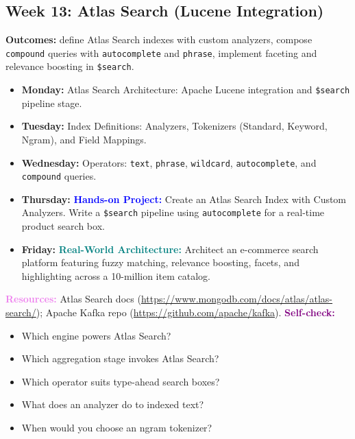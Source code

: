\documentclass[11pt, a4paper]{article}
\newcommand{\project}[1]{\textbf{\textcolor{blue}{Hands-on Project:}} #1}
\newcommand{\usecase}[1]{\textbf{\textcolor{teal}{Real-World Architecture:}} #1}
\newcommand{\dayitem}[2]{\item \textbf{#1:} #2}
\newcommand{\selfcheck}[1]{\vspace{1mm}\noindent\textbf{\textcolor{purple}{Self-check:}} #1}
\newcommand{\resources}[1]{\vspace{1mm}\noindent\textbf{\textcolor{violet}{Resources:}} #1}
\begin{document}
\subsection*{Week 13: Atlas Search (Lucene Integration)}
\par\noindent\textbf{Outcomes:} define Atlas Search indexes with custom analyzers, compose \texttt{compound} queries with \texttt{autocomplete} and \texttt{phrase}, implement faceting and relevance boosting in \texttt{\$search}.
\begin{itemize}[label=-]
    \dayitem{Monday}{Atlas Search Architecture: Apache Lucene integration and \texttt{\$search} pipeline stage.}
    \dayitem{Tuesday}{Index Definitions: Analyzers, Tokenizers (Standard, Keyword, Ngram), and Field Mappings.}
    \dayitem{Wednesday}{Operators: \texttt{text}, \texttt{phrase}, \texttt{wildcard}, \texttt{autocomplete}, and \texttt{compound} queries.}
    \dayitem{Thursday}{\project{Create an Atlas Search Index with Custom Analyzers. Write a \texttt{\$search} pipeline using \texttt{autocomplete} for a real-time product search box.}}
    \dayitem{Friday}{\usecase{Architect an e-commerce search platform featuring fuzzy matching, relevance boosting, facets, and highlighting across a 10-million item catalog.}}
\end{itemize}
\resources{Atlas Search docs (\url{https://www.mongodb.com/docs/atlas/atlas-search/}); Apache Kafka repo (\url{https://github.com/apache/kafka}).}
\selfcheck{\begin{itemize}[label=-, itemsep=0pt, leftmargin=1.5em]
    \item Which engine powers Atlas Search?
    \item Which aggregation stage invokes Atlas Search?
    \item Which operator suits type-ahead search boxes?
    \item What does an analyzer do to indexed text?
    \item When would you choose an ngram tokenizer?
\end{itemize}}
\end{document}
